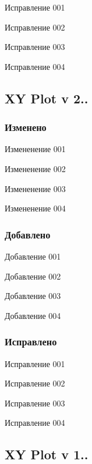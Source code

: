 \begin{DoxyItemize}
\item Исправление 001 \item Исправление 002 \item Исправление 003 \item Исправление 004 \end{DoxyItemize}
\hypertarget{page1_subsecV211}{}\subsection{X\-Y Plot v 2..}\label{page1_subsecV211}
\hypertarget{page1_ssubV211Changes}{}\subsubsection{Изменено}\label{page1_ssubV211Changes}
\begin{DoxyItemize}
\item Измененение 001 \item Измененение 002 \item Измененение 003 \item Измененение 004 \end{DoxyItemize}
\hypertarget{page1_ssubV211Add}{}\subsubsection{Добавлено}\label{page1_ssubV211Add}
\begin{DoxyItemize}
\item Добавление 001 \item Добавление 002 \item Добавление 003 \item Добавление 004 \end{DoxyItemize}
\hypertarget{page1_ssubV211Fixed}{}\subsubsection{Исправлено}\label{page1_ssubV211Fixed}
\begin{DoxyItemize}
\item Исправление 001 \item Исправление 002 \item Исправление 003 \item Исправление 004 \end{DoxyItemize}
\hypertarget{page1_subsecV101}{}\subsection{X\-Y Plot v 1..}\label{page1_subsecV101}
